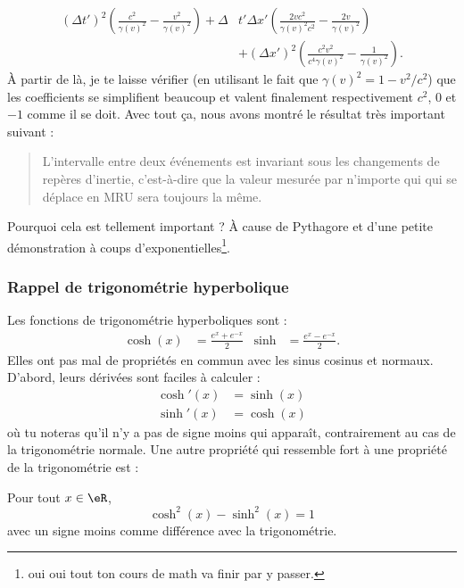 \[
\begin{split}
  (\Delta t')^2\left( \frac{ c^2 }{ \gamma(v)^2 }-\frac{ v^2 }{ \gamma(v)^2 } \right)+\Delta &t'\Delta x'\left( \frac{ 2vc^2 }{ \gamma(v)^2c^2 }-\frac{ 2v }{ \gamma(v)^2 } \right)\\
	&+(\Delta x')^2\left( \frac{ c^2 v^2 }{ c^4\gamma(v)^2 }-\frac{1}{ \gamma(v)^2 } \right).
\end{split}
\]
À partir de là, je te laisse vérifier (en utilisant le fait que $\gamma(v)^2=1-v^2/c^2$) que les coefficients se simplifient beaucoup et valent finalement respectivement $c^2$, $0$ et $-1$ comme il se doit. Avec tout ça, nous avons montré le résultat très important suivant :
\begin{quote}
L'intervalle entre deux événements est invariant sous les changements de repères d'inertie, c'est-à-dire que la valeur mesurée par n'importe qui qui se déplace en MRU sera toujours la même.
\end{quote}
Pourquoi cela est tellement important ? À cause de Pythagore et d'une petite démonstration à coups d'exponentielles\footnote{oui oui tout ton cours de math va finir par y passer.}.

\subsubsection{Rappel de trigonométrie hyperbolique}
\label{SUBSUBSECooZVHLooYwuhAj}

Les fonctions de trigonométrie hyperboliques sont :
\begin{align}
\cosh(x)&=\frac{  e^{x}+ e^{-x} }{ 2 }&\sinh&=\frac{  e^{x}- e^{-x} }{ 2 }.
\end{align}
Elles ont pas mal de propriétés en commun avec les sinus cosinus et normaux. D'abord, leurs dérivées sont faciles à calculer :
\[
\begin{split}
\cosh'(x)&=\sinh(x)\\
\sinh'(x)&=\cosh(x)
\end{split}
\]
où tu noteras qu'il n'y a pas de signe moins qui apparaît, contrairement au cas de la trigonométrie normale. Une autre propriété qui ressemble fort à une propriété de la trigonométrie est :

\begin{proposition}
Pour tout $x\in\eR$,
\begin{equation}
	\cosh^2(x)-\sinh^2(x)=1
\end{equation}
avec un signe moins comme différence avec la trigonométrie.
\end{proposition}

